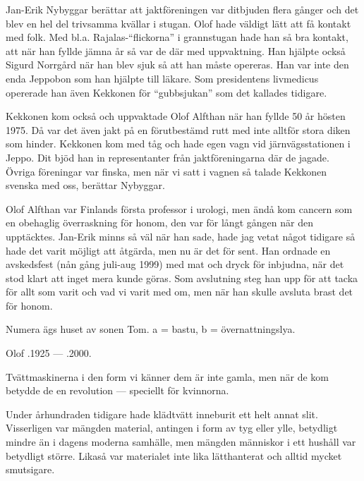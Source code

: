 Jan-Erik Nybyggar berättar att jaktföreningen var ditbjuden flera gånger och det blev en hel del trivsamma kvällar i stugan. Olof hade väldigt lätt att få kontakt med folk. Med bl.a. Rajalas-``flickorna'' i grannstugan hade han så bra kontakt, att när han fyllde jämna år så var de där med uppvaktning. Han hjälpte också Sigurd Norrgård när han blev sjuk så att han måste opereras. Han var inte den enda Jeppobon som han hjälpte till läkare. Som presidentens livmedicus 	opererade han även Kekkonen för ``gubbsjukan'' som det kallades	tidigare.

Kekkonen kom också och uppvaktade Olof Alfthan när han fyllde 50 	år hösten 1975. Då var det även jakt på en förutbestämd rutt med inte alltför stora diken som hinder. Kekkonen kom med tåg och hade egen vagn vid järnvägsstationen i Jeppo. Dit bjöd han in representanter från jaktföreningarna där de jagade. Övriga föreningar var finska, men när vi satt i vagnen så talade Kekkonen svenska med oss, berättar Nybyggar.

Olof Alfthan var Finlands första professor i urologi, men ändå kom cancern som en obehaglig överraskning för honom, den var för långt gången när den upptäcktes. Jan-Erik minns så väl när han sade, hade jag vetat något tidigare så hade det varit möjligt att åtgärda, men nu är det för sent. Han ordnade en avskedsfest (nån gång juli-aug 1999) med mat och dryck för inbjudna, när det stod klart att inget mera kunde göras. Som avslutning steg han upp för att tacka för allt som 	varit och vad vi varit med om, men när han skulle avsluta brast det för honom.

Numera ägs huset av sonen Tom. a = bastu, b = övernattningslya.

Olof .1925 --- .2000.



%


%

\jhnooccupant{}

Tvättmaskinerna i den form vi känner dem är inte gamla, men när de kom betydde de en revolution --- speciellt för kvinnorna.

Under århundraden tidigare hade klädtvätt inneburit ett helt annat slit. Visserligen var mängden material, antingen i form av tyg eller ylle, betydligt mindre än i dagens moderna samhälle, men mängden människor i ett hushåll var betydligt större. Likaså var materialet inte lika lätthanterat och alltid mycket smutsigare.

